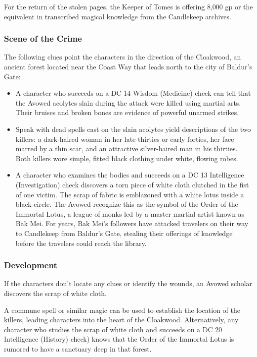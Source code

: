 \documentclass[10pt,a4paper,twoside,bg=print,twocolumn,openany,nodeprecatedcode]{dndbook}
\begin{document}
For the return of the stolen pages, the Keeper of Tomes is offering 8,000 gp or the equivalent in transcribed magical knowledge from the Candlekeep archives.

\subsubsection{Scene of the Crime}
The following clues point the characters in the direction of the Cloakwood, an ancient forest located near the Coast Way that leads north to the city of Baldur's Gate:


\begin{itemize}
\item A character who succeeds on a DC 14 Wisdom (Medicine) check can tell that the Avowed acolytes slain during the attack were killed using martial arts. Their bruises and broken bones are evidence of powerful unarmed strikes.
\item Speak with dead spells cast on the slain acolytes yield descriptions of the two killers: a dark-haired woman in her late thirties or early forties, her face marred by a thin scar, and an attractive silver-haired man in his thirties. Both killers wore simple, fitted black clothing under white, flowing robes.
\item A character who examines the bodies and succeeds on a DC 13 Intelligence (Investigation) check discovers a torn piece of white cloth clutched in the fist of one victim. The scrap of fabric is emblazoned with a white lotus inside a black circle. The Avowed recognize this as the symbol of the Order of the Immortal Lotus, a league of monks led by a master martial artist known as Bak Mei. For years, Bak Mei's followers have attacked travelers on their way to Candlekeep from Baldur's Gate, stealing their offerings of knowledge before the travelers could reach the library. 
\end{itemize}

\subsubsection{Development}
If the characters don't locate any clues or identify the wounds, an Avowed scholar discovers the scrap of white cloth.

A commune spell or similar magic can be used to establish the location of the killers, leading characters into the heart of the Cloakwood. Alternatively, any character who studies the scrap of white cloth and succeeds on a DC 20 Intelligence (History) check) knows that the Order of the Immortal Lotus is rumored to have a sanctuary deep in that forest.
\end{document}
